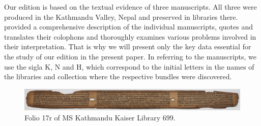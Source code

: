 Our edition is based on the textual evidence of three manuscripts.  All three were produced 
in the Kathmandu Valley, Nepal and preserved in libraries there. 
\textcites[\S 
2.1]{kleb-2021b} provided a comprehensive description of the individual manuscripts, quotes 
and translates their colophons and thoroughly examines various problems involved in their 
interpretation. That is why we will present only the key data essential for the study of our 
edition in the present paper.
In referring to the manuscripts, we use the sigla K, N and H, which correspond to the initial letters in the names of the libraries and collection where the respective bundles were discovered.

\begin{figure}[t]
    \centering
    \includegraphics[width=1\linewidth]{"media/017r IMG_0065"}
    \caption{Folio 17r of MS Kathmandu Kaiser Library 699.}
    \label{fig:017r-img0065}
\end{figure}


